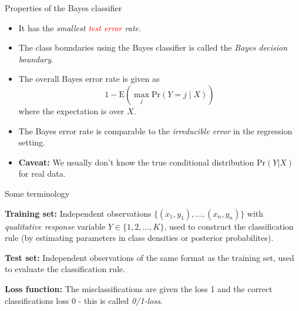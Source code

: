 \documentclass[
  10pt,
  ignorenonframetext,
]{beamer}
\providecommand{\tightlist}{%
  \setlength{\itemsep}{0pt}\setlength{\parskip}{0pt}}
\begin{document}
\begin{frame}
\begin{block}{Properties of the Bayes classifier}
\protect\hypertarget{properties-of-the-bayes-classifier}{}
\(~\)

\begin{itemize}
\tightlist
\item
  It has the \emph{smallest \textcolor{red}{test error} rate}.
\end{itemize}

\vspace{2mm}

\begin{itemize}
\tightlist
\item
  The class boundaries using the Bayes classifier is called the
  \emph{Bayes decision boundary}.
\end{itemize}

\vspace{2mm}

\begin{itemize}
\tightlist
\item
  The overall Bayes error rate is given as
  \[1-\text{E}(\max_j \text{Pr}(Y=j\mid X))\] where the expectation is
  over \(X\).
\end{itemize}

\vspace{2mm}

\begin{itemize}
\tightlist
\item
  The Bayes error rate is comparable to the \emph{irreducible error} in
  the regression setting.
\end{itemize}

\vspace{2mm}

\begin{itemize}
\tightlist
\item
  \textbf{Caveat:} We usually don't know the true conditional
  distribution \(\text{Pr}(Y | X)\) for real data.
\end{itemize}
\end{block}
\end{frame}

\begin{frame}{Some terminology}
\protect\hypertarget{some-terminology}{}
\vspace{2mm}

\textbf{Training set:} Independent observations
\(\{(x_1, y_1), ..., (x_n, y_n)\}\) with \emph{qualitative response}
variable \(Y \in \{1, 2, ..., K\}\), used to construct the
classification rule (by estimating parameters in class densities or
posterior probabilites).

\vspace{2mm}

\textbf{Test set:} Independent observations of the same format as the
training set, used to evaluate the classification rule.

\vspace{2mm}

\textbf{Loss function:} The misclassifications are given the loss 1 and
the correct classifications loss 0 - this is called \emph{0/1-loss}.
\end{frame}
\end{document}
